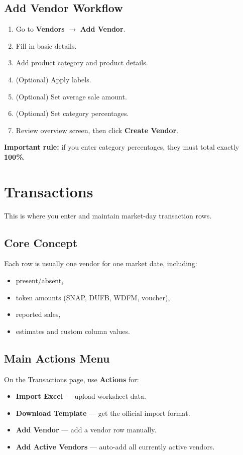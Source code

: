 \documentclass[11pt]{article}
\begin{document}
\subsection{Add Vendor Workflow}
\begin{enumerate}
  \item Go to \textbf{Vendors} $\rightarrow$ \textbf{Add Vendor}.
  \item Fill in basic details.
  \item Add product category and product details.
  \item (Optional) Apply labels.
  \item (Optional) Set average sale amount.
  \item (Optional) Set category percentages.
  \item Review overview screen, then click \textbf{Create Vendor}.
\end{enumerate}

\textbf{Important rule:} if you enter category percentages, they must total exactly \textbf{100\%}.

\section{Transactions}
This is where you enter and maintain market-day transaction rows.

\subsection{Core Concept}
Each row is usually one vendor for one market date, including:
\begin{itemize}
  \item present/absent,
  \item token amounts (SNAP, DUFB, WDFM, voucher),
  \item reported sales,
  \item estimates and custom column values.
\end{itemize}

\subsection{Main Actions Menu}
On the Transactions page, use \textbf{Actions} for:
\begin{itemize}
  \item \textbf{Import Excel} --- upload worksheet data.
  \item \textbf{Download Template} --- get the official import format.
  \item \textbf{Add Vendor} --- add a vendor row manually.
  \item \textbf{Add Active Vendors} --- auto-add all currently active vendors.
\end{itemize}
\end{document}
